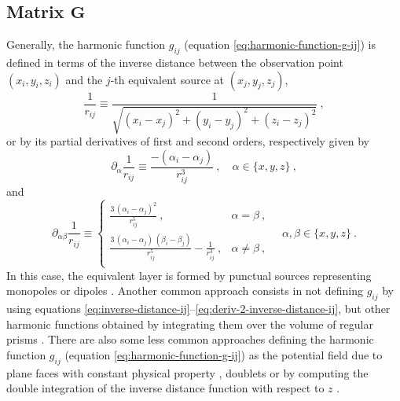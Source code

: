 \documentclass[utf8]{FrontiersinHarvard} %
\begin{document}
	\subsection{Matrix $\mathbf{G}$}
	\label{subsec:sensitivity-matrix}
	
	Generally, the harmonic function $g_{ij}$ (equation \ref{eq:harmonic-function-g-ij}) is defined in terms of the 
	inverse distance between the observation point $(x_{i}, y_{i}, z_{i})$ and the $j$-th equivalent source at $(x_{j}, y_{j}, z_{j})$,
	\begin{equation}
		\frac{1}{r_{ij}} \equiv \frac{1}{\sqrt{(x_{i} - x_{j})^{2} + (y_{i} - y_{j})^{2} + (z_{i} - z_{j})^{2}}} \: ,
		\label{eq:inverse-distance-ij}
	\end{equation}
	or by its partial derivatives of first and second orders, respectively given by
	\begin{equation}
		\partial_{\alpha} \frac{1}{r_{ij}} \equiv \frac{-(\alpha_{i} - \alpha_{j})}{r_{ij}^{3}} \: ,
		\quad \alpha \in \{ x, y, z \} \: ,
		\label{eq:deriv-1-inverse-distance-ij}
	\end{equation}
	and
	\begin{equation}
		\partial_{\alpha\beta} \frac{1}{r_{ij}} \equiv 
		\begin{cases}
			\frac{3 \, (\alpha_{i} - \alpha_{j})^{2}}{r_{ij}^{5}} \: , &\alpha = \beta \: , \\
			\frac{3 \, (\alpha_{i} - \alpha_{j}) \, (\beta_{i} - \beta_{j})}{r_{ij}^{5}} - \frac{1}{r_{ij}^{3}} \: , &\alpha \ne \beta \: , \\
		\end{cases}
		\quad \alpha, \beta \in \{ x, y, z \} \: .
		\label{eq:deriv-2-inverse-distance-ij}
	\end{equation}
	In this case, the equivalent layer is formed by punctual sources representing monopoles or dipoles
	\cite[e.g.,][]{dampney1969, emilia1973, leao-silva1989, cordell1992, oliveirajr-etal2013, siqueira-etal2017, reis-etal2020, takahashi-etal2020, soler-uieda2021, takahashi-etal2022}.
	Another common approach consists in not defining $g_{ij}$ by using equations \ref{eq:inverse-distance-ij}--\ref{eq:deriv-2-inverse-distance-ij},
	but other harmonic functions obtained by integrating them over the volume of regular prisms 
	\cite[e.g.,][]{li-oldenburg2010, barnes-lumley2011, li_etal_2014, jirigalatu-ebbing2019}.
	There are also some less common approaches defining the harmonic function $g_{ij}$ (equation \ref{eq:harmonic-function-g-ij})
	as the potential field due to plane faces with constant physical property \citep{hansen-miyazaki1984}, doublets \citep{silva1986} or
	by computing the double integration of the inverse distance function with respect to $z$ \citep{guspi-novara2009}.
	
\end{document}
